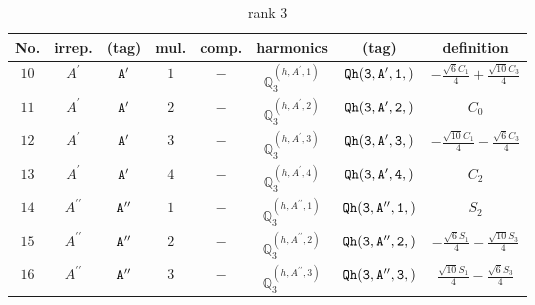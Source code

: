 \documentclass[fleqn,8pt]{jsarticle}
\begin{document}
\begin{table}[ht!]
\begin{center}
\caption{rank 3}
\renewcommand{\arraystretch}{1.3}
\begin{tabular}{cccccccc} \hline \hline
No. & irrep. & (tag) & mul. & comp. & harmonics & (tag) & definition \\ \hline
$ 10 $ & $ A^{\prime} $ & $ {\tt A'} $ & $ 1 $ & $ - $ & $ \mathbb{Q}_{3}^{(h,A^{\prime},1)} $ & $ {\tt Qh(3,A',1,)} $ & $ - \frac{\sqrt{6} C_{1}}{4} + \frac{\sqrt{10} C_{3}}{4} $ \\
$ 11 $ & $ A^{\prime} $ & $ {\tt A'} $ & $ 2 $ & $ - $ & $ \mathbb{Q}_{3}^{(h,A^{\prime},2)} $ & $ {\tt Qh(3,A',2,)} $ & $ C_{0} $ \\
$ 12 $ & $ A^{\prime} $ & $ {\tt A'} $ & $ 3 $ & $ - $ & $ \mathbb{Q}_{3}^{(h,A^{\prime},3)} $ & $ {\tt Qh(3,A',3,)} $ & $ - \frac{\sqrt{10} C_{1}}{4} - \frac{\sqrt{6} C_{3}}{4} $ \\
$ 13 $ & $ A^{\prime} $ & $ {\tt A'} $ & $ 4 $ & $ - $ & $ \mathbb{Q}_{3}^{(h,A^{\prime},4)} $ & $ {\tt Qh(3,A',4,)} $ & $ C_{2} $ \\
$ 14 $ & $ A^{\prime\prime} $ & $ {\tt A''} $ & $ 1 $ & $ - $ & $ \mathbb{Q}_{3}^{(h,A^{\prime\prime},1)} $ & $ {\tt Qh(3,A'',1,)} $ & $ S_{2} $ \\
$ 15 $ & $ A^{\prime\prime} $ & $ {\tt A''} $ & $ 2 $ & $ - $ & $ \mathbb{Q}_{3}^{(h,A^{\prime\prime},2)} $ & $ {\tt Qh(3,A'',2,)} $ & $ - \frac{\sqrt{6} S_{1}}{4} - \frac{\sqrt{10} S_{3}}{4} $ \\
$ 16 $ & $ A^{\prime\prime} $ & $ {\tt A''} $ & $ 3 $ & $ - $ & $ \mathbb{Q}_{3}^{(h,A^{\prime\prime},3)} $ & $ {\tt Qh(3,A'',3,)} $ & $ \frac{\sqrt{10} S_{1}}{4} - \frac{\sqrt{6} S_{3}}{4} $ \\
 \hline \hline
\end{tabular}
\end{center}
\end{table}
\end{document}
